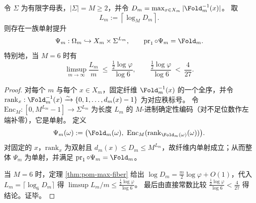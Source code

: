 \begin{proposition}[秩编码给出的可逆事件词提升]\label{prop:fold-local-rewrite-rank-encoding-reversible-lift}
令 \(\Sigma\) 为有限字母表，\(|\Sigma|=M\ge 2\)，并令
\(
D_m=\max_{x\in X_m}|\Fold_m^{-1}(x)|
\)。
取
\[
L_m:=\left\lceil \log_M D_m\right\rceil.
\]
则存在一族单射提升
\[
\Psi_m:\Omega_m\hookrightarrow X_m\times \Sigma^{L_m},
\qquad
\operatorname{pr}_1\circ\Psi_m=\Fold_m.
\]
特别地，当 \(M=6\) 时有
\[
\limsup_{m\to\infty}\frac{L_m}{m}\ \le\ \frac{\tfrac12\log\varphi}{\log 6},
\qquad
\frac{\tfrac12\log\varphi}{\log 6}\ <\ \frac{4}{27}.
\]
\end{proposition}
\begin{proof}
对每个 \(m\) 与每个 \(x\in X_m\)，固定纤维 \(\Fold_m^{-1}(x)\) 的一个全序，并令 \(\mathrm{rank}_x:\Fold_m^{-1}(x)\xrightarrow{\sim}\{0,1,\dots,d_m(x)-1\}\) 为对应秩标号。
令 \(\mathrm{Enc}_M:[0,M^{L_m}-1]\to \Sigma^{L_m}\) 为长度 \(L_m\) 的 \(M\)-进制确定性编码（对不足位数作左端补零），它是单射。
定义
\[
\Psi_m(\omega):=\bigl(\Fold_m(\omega),\ \mathrm{Enc}_M(\mathrm{rank}_{\Fold_m(\omega)}(\omega))\bigr).
\]
对固定的 \(x\)，\(\mathrm{rank}_x\) 为双射且 \(d_m(x)\le D_m\le M^{L_m}\)，故纤维内单射成立；从而整体 \(\Psi_m\) 为单射，并满足 \(\operatorname{pr}_1\circ\Psi_m=\Fold_m\)。
\par
当 \(M=6\) 时，定理 \ref{thm:pom-max-fiber} 给出 \(\log D_m=\frac{m}{2}\log\varphi+O(1)\)，代入 \(L_m=\lceil \log_6 D_m\rceil\) 得 \(\limsup L_m/m\le \frac{\tfrac12\log\varphi}{\log 6}\)。
最后由直接常数比较 \(\frac{\tfrac12\log\varphi}{\log 6}<\frac{4}{27}\) 得结论。证毕。
\end{proof}

